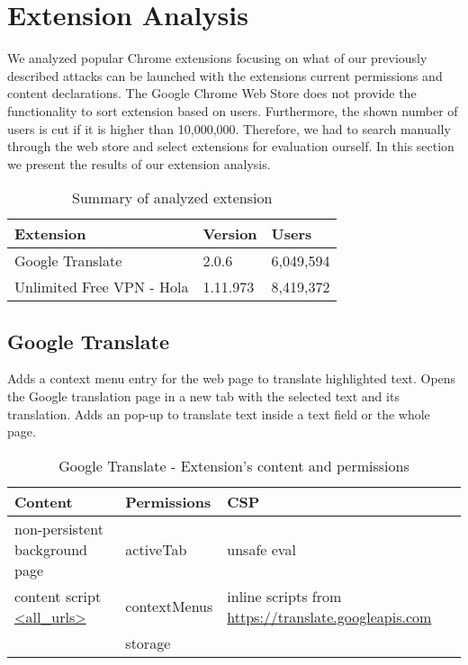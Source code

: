 
\chapter{Extension Analysis}
	
	We analyzed popular Chrome extensions focusing on what of our previously described attacks can be launched with the extensions current permissions and content declarations. The Google Chrome Web Store does not provide the functionality to sort extension based on users. Furthermore, the shown number of users is cut if it is higher than 10,000,000. Therefore, we had to search manually through the web store and select extensions for evaluation ourself. In this section we present the results of our extension analysis. 
	
	\begin{table}
		\centering
		\begin{tabular}{|l|l|l|} \hline
			\textbf{Extension} & \textbf{Version} & \textbf{Users} \\ \hline
			Google Translate & 2.0.6 & 6,049,594 \\ 
			Unlimited Free VPN - Hola & 1.11.973 & 8,419,372 \\ \hline
		\end{tabular}
		\caption{Summary of analyzed extension}
	\end{table}
	
	
\section{Google Translate}
	Adds a context menu entry for the web page to translate highlighted text. Opens the Google translation page in a new tab with the selected text and its translation. Adds an pop-up to translate text inside a text field or the whole page. \\
	
	\begin{table}[h]
		\centering
		\begin{tabular}{|l|l|l|} \hline
			\textbf{Content} & \textbf{Permissions} & \textbf{CSP} \\ \hline
			non-persistent background page & activeTab & unsafe eval\\
			content script \url{<all_urls>} & contextMenus & inline scripts from \url{https://translate.googleapis.com} \\
			& storage & \\ \hline
		\end{tabular}
		\caption{Google Translate - Extension's content and permissions}
	\end{table}
	
